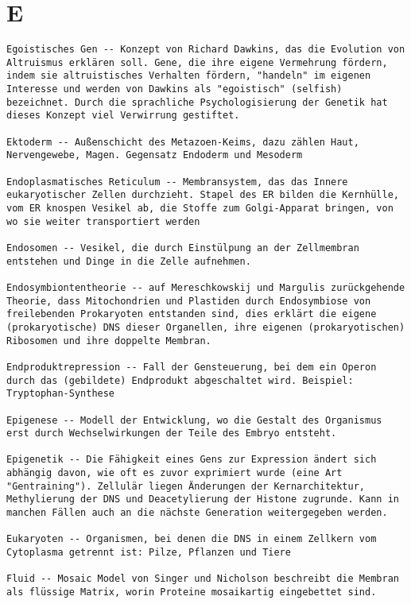 \documentclass{article}
\begin{document}
\section{E}
\begin{verbatim}
Egoistisches Gen -- Konzept von Richard Dawkins, das die Evolution von Altruismus erklären soll. Gene, die ihre eigene Vermehrung fördern, indem sie altruistisches Verhalten fördern, "handeln" im eigenen Interesse und werden von Dawkins als "egoistisch" (selfish) bezeichnet. Durch die sprachliche Psychologisierung der Genetik hat dieses Konzept viel Verwirrung gestiftet.

Ektoderm -- Außenschicht des Metazoen-Keims, dazu zählen Haut, Nervengewebe, Magen. Gegensatz Endoderm und Mesoderm

Endoplasmatisches Reticulum -- Membransystem, das das Innere eukaryotischer Zellen durchzieht. Stapel des ER bilden die Kernhülle, vom ER knospen Vesikel ab, die Stoffe zum Golgi-Apparat bringen, von wo sie weiter transportiert werden

Endosomen -- Vesikel, die durch Einstülpung an der Zellmembran entstehen und Dinge in die Zelle aufnehmen.

Endosymbiontentheorie -- auf Mereschkowskij und Margulis zurückgehende Theorie, dass Mitochondrien und Plastiden durch Endosymbiose von freilebenden Prokaryoten entstanden sind, dies erklärt die eigene (prokaryotische) DNS dieser Organellen, ihre eigenen (prokaryotischen) Ribosomen und ihre doppelte Membran.

Endproduktrepression -- Fall der Gensteuerung, bei dem ein Operon durch das (gebildete) Endprodukt abgeschaltet wird. Beispiel: Tryptophan-Synthese

Epigenese -- Modell der Entwicklung, wo die Gestalt des Organismus erst durch Wechselwirkungen der Teile des Embryo entsteht.

Epigenetik -- Die Fähigkeit eines Gens zur Expression ändert sich abhängig davon, wie oft es zuvor exprimiert wurde (eine Art "Gentraining"). Zellulär liegen Änderungen der Kernarchitektur, Methylierung der DNS und Deacetylierung der Histone zugrunde. Kann in manchen Fällen auch an die nächste Generation weitergegeben werden.

Eukaryoten -- Organismen, bei denen die DNS in einem Zellkern vom Cytoplasma getrennt ist: Pilze, Pflanzen und Tiere

Fluid -- Mosaic Model von Singer und Nicholson beschreibt die Membran als flüssige Matrix, worin Proteine mosaikartig eingebettet sind.
\end{verbatim}
\newpage
\end{document}
